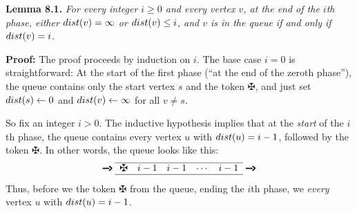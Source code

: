 \textbf{Lemma 8.1.} \textsl{For every integer $i \ge 0$ and every vertex $v$, at the end of the $i$th phase, either $dist(v) = \infty$ or $dist(v) \le i$, and $v$ is in the queue if and only if $dist(v) = i$.}

\textbf{Proof:} The proof proceeds by induction on $i$.
The base case $i = 0$ is straightforward: At the start of the first phase (“at the end of the zeroth phase”), the queue contains only the start vertex $s$ and the token $\maltese$, and  just set $dist(s) \gets 0$ and $dist(v) \gets \infty$ for all $v \neq s$.

So fix an integer $i > 0$.
The inductive hypothesis implies that at the \textit{start} of the $i$th phase, the queue contains every vertex $u$ with $dist(u) = i - 1$, followed by the token $\maltese$.
In other words, the queue looks like this:
\[
\mbox{\rule[.5ex]{.7em}{1.2pt}\kern-.5pt\raisebox{.5ex}{\rotatebox[origin=r]{-40}{\rule{.38em}{1.2pt}}}\kern-.38em\raisebox{.5ex}{\rotatebox[origin=r]{40}{\rule{.38em}{1.2pt}}}}
\;\begin{array}{ccccc}\hline \maltese & i-1 & i-1 & \cdots & i-1\\\hline\end{array}\;
\mbox{\rule[.5ex]{.7em}{1.2pt}\kern-.5pt\raisebox{.5ex}{\rotatebox[origin=r]{-40}{\rule{.38em}{1.2pt}}}\kern-.38em\raisebox{.5ex}{\rotatebox[origin=r]{40}{\rule{.38em}{1.2pt}}}}
\]
Thus, before we  the token $\maltese$ from the queue, ending the $i$th phase, we  \textit{every} vertex $u$ with $dist(u) = i - 1$.

